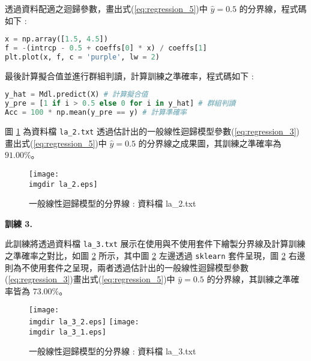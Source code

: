 透過資料配適之迴歸參數，畫出式(\ref{eq:regression_5})中 $\hat{y} = 0.5$ 的分界線，程式碼如下 :
\bigskip
\begin{lstlisting}[language = Python]
x = np.array([1.5, 4.5])
f = -(intrcp - 0.5 + coeffs[0] * x) / coeffs[1]
plt.plot(x, f, c = 'purple', lw = 2)
\end{lstlisting}

最後計算擬合值並進行群組判讀，計算訓練之準確率，程式碼如下 :
\bigskip
\begin{lstlisting}[language = Python]
y_hat = Mdl.predict(X) # 計算擬合值
y_pre = [1 if i > 0.5 else 0 for i in y_hat] # 群組判讀
Acc = 100 * np.mean(y_pre == y) # 計算準確率
\end{lstlisting}

圖 \ref{fig:la_2} 為資料檔 \verb|la_2.txt| 透過估計出的一般線性迴歸模型參數(\ref{eq:regression_3})畫出式(\ref{eq:regression_5})中 $\hat{y} = 0.5$ 的分界線之成果圖，其訓練之準確率為 $91.00	\%$。
\begin{figure}[H]
    \centering
        \texttt{[image: \\imgdir la\_2.eps]}
    \caption{一般線性迴歸模型的分界線 : 資料檔 la\_2.txt}
    \label{fig:la_2}
\end{figure}

\textbf{\large 訓練 3.}

此訓練將透過資料檔 \verb|la_3.txt| 展示在使用與不使用套件下繪製分界線及計算訓練之準確率之對比，如圖 \ref{fig:la_3} 所示，其中圖 \ref{fig:la_3} 左邊透過 \verb|sklearn| 套件呈現，圖 \ref{fig:la_3} 右邊則為不使用套件之呈現，兩者透過估計出的一般線性迴歸模型參數(\ref{eq:regression_3})畫出式(\ref{eq:regression_5})中 $\hat{y} = 0.5$ 的分界線，其訓練之準確率皆為 $73.00\%$。
\bigskip
\begin{figure}[H]
\centering
\texttt{[image: \\imgdir la\_3\_2.eps]}
\texttt{[image: \\imgdir la\_3\_1.eps]}
\caption{一般線性迴歸模型的分界線 : 資料檔 la\_3.txt} 
\label{fig:la_3}
\end{figure}

